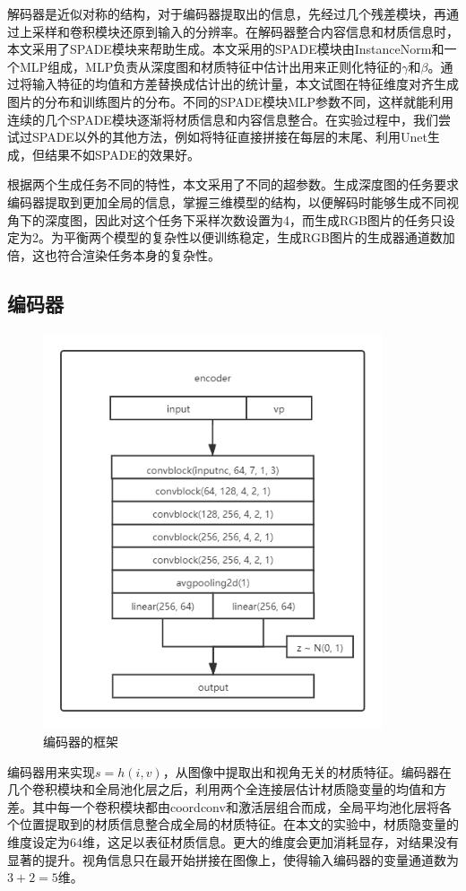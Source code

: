 \documentclass[UTF8,openany,AutoFakeBold,AutoFakeSlant,cs4size]{ctexbook}
\begin{document}
解码器是近似对称的结构，对于编码器提取出的信息，先经过几个残差模块，再通过上采样和卷积模块还原到输入的分辨率。在解码器整合内容信息和材质信息时，本文采用了SPADE模块来帮助生成。本文采用的SPADE模块由InstanceNorm和一个MLP组成，MLP负责从深度图和材质特征中估计出用来正则化特征的$\gamma$和$\beta$。通过将输入特征的均值和方差替换成估计出的统计量，本文试图在特征维度对齐生成图片的分布和训练图片的分布。不同的SPADE模块MLP参数不同，这样就能利用连续的几个SPADE模块逐渐将材质信息和内容信息整合。在实验过程中，我们尝试过SPADE以外的其他方法，例如将特征直接拼接在每层的末尾、利用Unet生成，但结果不如SPADE的效果好。

根据两个生成任务不同的特性，本文采用了不同的超参数。生成深度图的任务要求编码器提取到更加全局的信息，掌握三维模型的结构，以便解码时能够生成不同视角下的深度图，因此对这个任务下采样次数设置为4，而生成RGB图片的任务只设定为2。为平衡两个模型的复杂性以便训练稳定，生成RGB图片的生成器通道数加倍，这也符合渲染任务本身的复杂性。


\subsection{编码器}

\begin{figure}
\centering
\includegraphics[width=10cm]{./images/encoder.png}
\caption{编码器的框架}
\label{fig:sample}
\end{figure}

编码器用来实现$s = h(i, v)$，从图像中提取出和视角无关的材质特征。编码器在几个卷积模块和全局池化层之后，利用两个全连接层估计材质隐变量的均值和方差。其中每一个卷积模块都由coordconv和激活层组合而成，全局平均池化层将各个位置提取到的材质信息整合成全局的材质特征。在本文的实验中，材质隐变量的维度设定为64维，这足以表征材质信息。更大的维度会更加消耗显存，对结果没有显著的提升。视角信息只在最开始拼接在图像上，使得输入编码器的变量通道数为$3 + 2 = 5$维。
\end{document}
